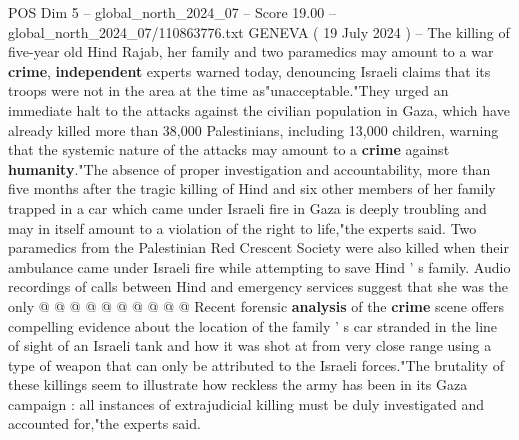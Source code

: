 \begin{textsample}{POS Dim 5 – global\_north\_2024\_07 – Score 19.00 – global\_north\_2024\_07/110863776.txt}  \label{ex:f5_pos_302}
GENEVA ( 19 July 2024 ) -- The killing of five-year old Hind Rajab, her family and two paramedics may amount to a war \textbf{crime}, \textbf{independent} experts warned today, denouncing Israeli claims that its troops were not in the area at the time as"unacceptable."They urged an immediate halt to the attacks against the civilian population in Gaza, which have already killed more than 38,000 Palestinians, including 13,000 children, warning that the systemic nature of the attacks may amount to a \textbf{crime} against \textbf{humanity}."The absence of proper investigation and accountability, more than five months after the tragic killing of Hind and six other members of her family trapped in a car which came under Israeli fire in Gaza is deeply troubling and may in itself amount to a violation of the right to life,"the experts said.
Two paramedics from the Palestinian Red Crescent Society were also killed when their ambulance came under Israeli fire while attempting to save Hind ' s family.
Audio recordings of calls between Hind and emergency services suggest that she was the only @ @ @ @ @ @ @ @ @ @ Recent forensic \textbf{analysis} of the \textbf{crime} scene offers compelling evidence about the location of the family ' s car stranded in the line of sight of an Israeli tank and how it was shot at from very close range using a type of weapon that can only be attributed to the Israeli forces."The brutality of these killings seem to illustrate how reckless the army has been in its Gaza campaign : all instances of extrajudicial killing must be duly investigated and accounted for,"the experts said.

\end{textsample}
